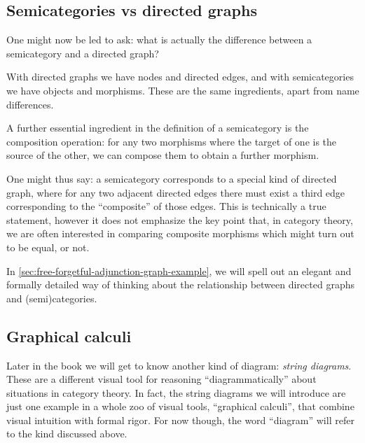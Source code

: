 \subsection{Semicategories vs directed graphs}

One might now be led to ask: what is actually the difference between a semicategory and a directed graph?

With directed graphs we have nodes and directed edges, and with semicategories we have objects and morphisms.
These are the same ingredients, apart from name differences.

A further essential ingredient in the definition of a semicategory is the composition operation: for any two morphisms where the target of one is the source of the other, we can compose them to obtain a further morphism.

One might thus say: a semicategory corresponds to a special kind of directed graph, where for any two adjacent directed edges there must exist a third edge corresponding to the ``composite'' of those edges.
This is technically a true statement, however it does not emphasize the key point that, in category theory, we are often interested in comparing composite morphisms which might turn out to be equal, or not.

In \cref{sec:free-forgetful-adjunction-graph-example}, we will spell out an elegant and formally detailed way of thinking about the relationship between directed graphs and (semi)categories.

\subsection{Graphical calculi}

Later in the book we will get to know another kind of diagram: \emph{string diagrams}.
These are a different visual tool for reasoning ``diagrammatically'' about situations in category theory.
In fact, the string diagrams we will introduce are just one example in a whole zoo of visual tools, ``graphical calculi'', that combine visual intuition with formal rigor.
For now though, the word ``diagram'' will refer to the kind discussed above.

